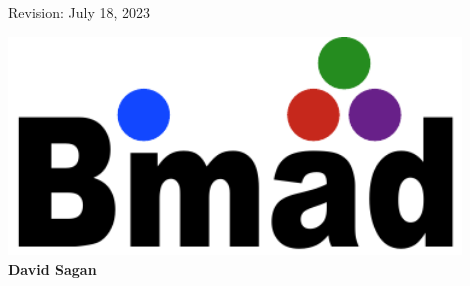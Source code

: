 
\thispagestyle{empty}

\begin{flushright}
\large
  Revision: July 18, 2023 \\
\end{flushright}


\vfill

{
\begin{center}
\includegraphics[width=12cm]{bmad-julia-manual-logo.pdf} \\
\vskip 0.3in
\huge\bf David Sagan
\end{center}
}

\vfill
\break
